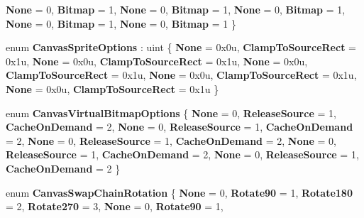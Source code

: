 \begin{DoxyCompactItemize}
{\bfseries None} = 0, 
{\bfseries Bitmap} = 1, 
{\bfseries None} = 0, 
{\bfseries Bitmap} = 1, 
\newline
{\bfseries None} = 0, 
{\bfseries Bitmap} = 1, 
{\bfseries None} = 0, 
{\bfseries Bitmap} = 1, 
\newline
{\bfseries None} = 0, 
{\bfseries Bitmap} = 1
 \}
\item 
\mbox{\label{namespace_microsoft_1_1_graphics_1_1_canvas_ab6862b1a93938e7824d0fff2e6892380}} 
enum {\bfseries Canvas\+Sprite\+Options} \+: uint \{ \newline
{\bfseries None} = 0x0u, 
{\bfseries Clamp\+To\+Source\+Rect} = 0x1u, 
{\bfseries None} = 0x0u, 
{\bfseries Clamp\+To\+Source\+Rect} = 0x1u, 
\newline
{\bfseries None} = 0x0u, 
{\bfseries Clamp\+To\+Source\+Rect} = 0x1u, 
{\bfseries None} = 0x0u, 
{\bfseries Clamp\+To\+Source\+Rect} = 0x1u, 
\newline
{\bfseries None} = 0x0u, 
{\bfseries Clamp\+To\+Source\+Rect} = 0x1u
 \}
\item 
\mbox{\label{namespace_microsoft_1_1_graphics_1_1_canvas_a1a98137e8da81a9cc6c342d3aadbd14b}} 
enum {\bfseries Canvas\+Virtual\+Bitmap\+Options} \{ \newline
{\bfseries None} = 0, 
{\bfseries Release\+Source} = 1, 
{\bfseries Cache\+On\+Demand} = 2, 
{\bfseries None} = 0, 
\newline
{\bfseries Release\+Source} = 1, 
{\bfseries Cache\+On\+Demand} = 2, 
{\bfseries None} = 0, 
{\bfseries Release\+Source} = 1, 
\newline
{\bfseries Cache\+On\+Demand} = 2, 
{\bfseries None} = 0, 
{\bfseries Release\+Source} = 1, 
{\bfseries Cache\+On\+Demand} = 2, 
\newline
{\bfseries None} = 0, 
{\bfseries Release\+Source} = 1, 
{\bfseries Cache\+On\+Demand} = 2
 \}
\item 
\mbox{\label{namespace_microsoft_1_1_graphics_1_1_canvas_a1cf1111048d43d97b2294d0ff727e25c}} 
enum {\bfseries Canvas\+Swap\+Chain\+Rotation} \{ \newline
{\bfseries None} = 0, 
{\bfseries Rotate90} = 1, 
{\bfseries Rotate180} = 2, 
{\bfseries Rotate270} = 3, 
\newline
{\bfseries None} = 0, 
{\bfseries Rotate90} = 1, 

\end{DoxyCompactItemize}
